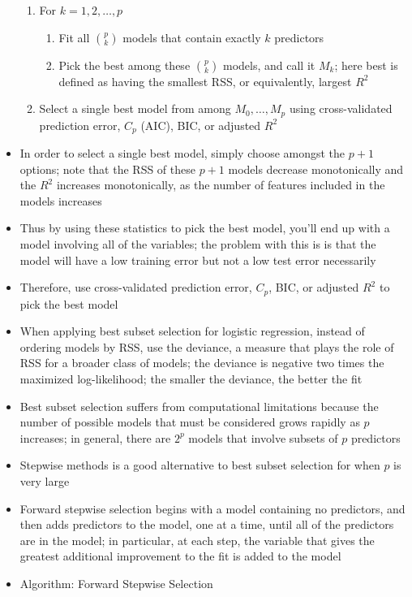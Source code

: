 \documentclass[12pt]{article}
\begin{document}
\begin{itemize}
\begin{enumerate}
\item For $k=1,2,\dots,p$ \begin{enumerate} 
\item Fit all $\binom{p}{k}$ models that contain exactly $k$ predictors
\item Pick the best among these $\binom{p}{k}$ models, and call it $M_k$; here best is defined as having the smallest RSS, or equivalently, largest $R^2$ \end{enumerate} 
\item Select a single best model from among $M_0,\dots,M_p$ using cross-validated prediction error, $C_p$ (AIC), BIC, or adjusted $R^2$ \end{enumerate} 
\item In order to select a single best model, simply choose amongst the $p+1$ options; note that the RSS of these $p+1$ models decrease monotonically and the $R^2$ increases monotonically, as the number of features included in the models increases 
\item Thus by using these statistics to pick the best model, you'll end up with a model involving all of the variables; the problem with this is is that the model will have a low training error but not a low test error necessarily
\item Therefore, use cross-validated prediction error, $C_p$, BIC, or adjusted $R^2$ to pick the best model 
\item When applying best subset selection for logistic regression, instead of ordering models by RSS, use the deviance, a measure that plays the role of RSS for a broader class of models; the deviance is negative two times the maximized log-likelihood; the smaller the deviance, the better the fit 
\item Best subset selection suffers from computational limitations because the number of possible models that must be considered grows rapidly as $p$ increases; in general, there are $2^p$ models that involve subsets of $p$ predictors 
\item Stepwise methods is a good alternative to best subset selection for when $p$ is very large 
\item Forward stepwise selection begins with a model containing no predictors, and then adds predictors to the model, one at a time, until all of the predictors are in the model; in particular, at each step, the variable that gives the greatest additional improvement to the fit is added to the model
\item Algorithm: Forward Stepwise Selection \begin{enumerate} 

\end{enumerate}
\end{itemize}
\end{document}
